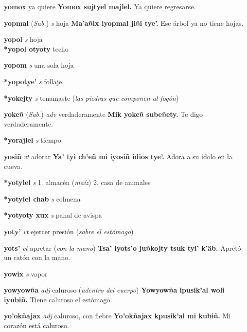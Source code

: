 \documentclass[10pt]{scrbook}
\newcommand{\entry}[1]{\textbf{#1}}
\newcommand{\onedefinition}[1]{#1.}
\newcommand{\partofspeech}[1]{\textit{#1}}
\newcommand{\spanishtranslation}[1]{#1}
\newcommand{\clarification}[1]{(\textit{#1})}
\newcommand{\cholexample}[1]{\textbf{#1}}
\newcommand{\exampletranslation}[1]{#1}
\newcommand{\relevantdialect}[1]{(\textit{#1})}
\newcommand{\secondaryentry}[1]{\\\textbf{#1}}
\newcommand{\secondtranslation}[1]{#1}
\begin{document}
\begin{multicols}{2}
\entry{yomox}
\spanishtranslation{ya quiere}
\cholexample{Yomox sujtyel majlel.}
\exampletranslation{Ya quiere regresarse.}

\entry{yopmal}
\relevantdialect{Sab.}
\partofspeech{s}
\spanishtranslation{hoja}
\cholexample{Ma'añix iyopmal jiñi tye'.}
\exampletranslation{Ese árbol ya no tiene hojas.}

\entry{yopol}
\partofspeech{s}
\spanishtranslation{hoja}
\secondaryentry{*yopol otyoty}
\secondtranslation{techo}

\entry{yopom}
\partofspeech{s}
\spanishtranslation{una sola hoja}

\entry{*yopotye'}
\partofspeech{s}
\spanishtranslation{follaje}

\entry{*yokejty}
\partofspeech{s}
\spanishtranslation{tenamaste}
\clarification{las piedras que componen al fogón}

\entry{yokeñ}
\relevantdialect{Sab.}
\partofspeech{adv}
\spanishtranslation{verdaderamente}
\cholexample{Mik yokeñ subeñety.}
\exampletranslation{Te digo verdaderamente.}

\entry{*yorajlel}
\partofspeech{s}
\spanishtranslation{tiempo}

\entry{yosiñ}
\partofspeech{vt}
\spanishtranslation{adorar}
\cholexample{Ya' tyi ch'eñ mi iyosiñ idios tye'.}
\exampletranslation{Adora a su ídolo en la cueva.}

\entry{*yotylel}
\partofspeech{s}
\onedefinition{1}
\spanishtranslation{almacén}
\clarification{maíz}
\onedefinition{2}
\spanishtranslation{casa de animales}

\entry{*yotylel chab}
\partofspeech{s}
\spanishtranslation{colmena}

\entry{*yotyoty xux}
\partofspeech{s}
\spanishtranslation{panal de avispa}

\entry{yoty'}
\partofspeech{vt}
\spanishtranslation{ejercer presión}
\clarification{sobre el estómago}

\entry{yots'}
\partofspeech{vt}
\spanishtranslation{apretar}
\clarification{con la mano}
\cholexample{Tsa' iyots'o juñkojty tsuk tyi' k'äb.}
\exampletranslation{Apretó un ratón con la mano.}

\entry{yowix}
\partofspeech{s}
\spanishtranslation{vapor}

\entry{yowyowña}
\partofspeech{adj}
\spanishtranslation{caluroso}
\clarification{adentro del cuerpo}
\cholexample{Yowyowña ipusik'al woli iyubiñ.}
\exampletranslation{Tiene caluroso el estómago.}

\entry{yo'okñajax}
\partofspeech{adj}
\spanishtranslation{caluroso, con fiebre}
\cholexample{Yo'okñajax kpusik'al mi kubiñ.}
\exampletranslation{Mi corazón está caluroso.}


\end{multicols}
\end{document}
